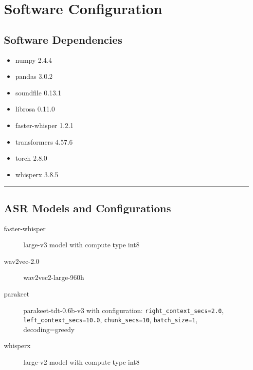 \chapter{Software Configuration}
\label{ch:software_config}
\section{Software Dependencies}
\begin{itemize}
    \item numpy 2.4.4
    \item pandas 3.0.2
    \item soundfile 0.13.1
    \item librosa 0.11.0
    \item faster-whisper 1.2.1
    \item transformers 4.57.6
    \item torch 2.8.0
    \item whisperx 3.8.5
\end{itemize}
\noindent\rule{\textwidth}{0.4pt}

\section{ASR Models and Configurations}
\begin{description}
    \item[faster-whisper] large-v3 model with compute type int8
    \item[wav2vec-2.0] wav2vec2-large-960h
    \item[parakeet] parakeet-tdt-0.6b-v3 with configuration: \texttt{right\_context\_secs=2.0}, \texttt{left\_context\_secs=10.0}, \texttt{chunk\_secs=10}, \texttt{batch\_size=1}, decoding=greedy
    \item[whisperx] large-v2 model with compute type int8
\end{description}